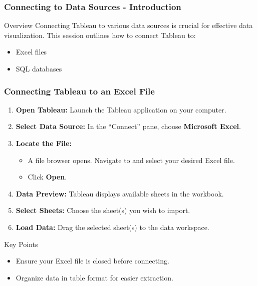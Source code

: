 \documentclass[aspectratio=169]{beamer}
\begin{document}
\begin{frame}[fragile]
    \frametitle{Connecting to Data Sources - Introduction}
    \begin{block}{Overview}
        Connecting Tableau to various data sources is crucial for effective data visualization. This session outlines how to connect Tableau to:
        \begin{itemize}
            \item Excel files
            \item SQL databases
        \end{itemize}
    \end{block}
\end{frame}

\begin{frame}[fragile]
    \frametitle{Connecting Tableau to an Excel File}
    \begin{enumerate}
        \item \textbf{Open Tableau:} Launch the Tableau application on your computer.
        \item \textbf{Select Data Source:} In the “Connect” pane, choose \textbf{Microsoft Excel}.
        \item \textbf{Locate the File:}
        \begin{itemize}
            \item A file browser opens. Navigate to and select your desired Excel file.
            \item Click \textbf{Open}.
        \end{itemize}
        \item \textbf{Data Preview:} Tableau displays available sheets in the workbook.
        \item \textbf{Select Sheets:} Choose the sheet(s) you wish to import.
        \item \textbf{Load Data:} Drag the selected sheet(s) to the data workspace.
    \end{enumerate}
    
    \begin{block}{Key Points}
        \begin{itemize}
            \item Ensure your Excel file is closed before connecting.
            \item Organize data in table format for easier extraction.
        \end{itemize}
    \end{block}
\end{frame}
\end{document}
